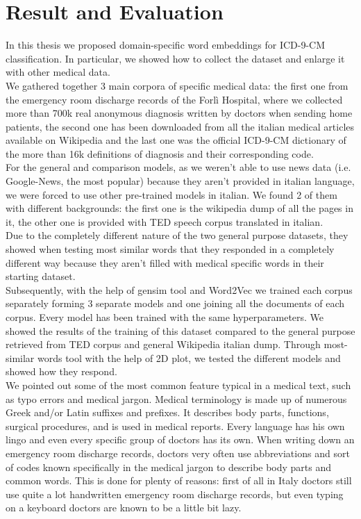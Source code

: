 \chapter{Result and Evaluation}
In this thesis we proposed domain-specific word embeddings for ICD-9-CM classification. In particular, we showed how to collect the dataset and enlarge it with other medical data.\\
We gathered together 3 main corpora of specific medical data: the first one from the emergency room discharge records of the Forlì Hospital, where we collected more than 700k real anonymous diagnosis written by doctors when sending home patients, the second one has been downloaded from all the italian medical articles available on Wikipedia and the last one was the official ICD-9-CM dictionary of the more than 16k definitions of diagnosis and their corresponding code.\\
For the general and comparison models, as we weren't able to use news data (i.e. Google-News, the most popular) because they aren't provided in italian language, we were forced to use other pre-trained models in italian. We found 2 of them with different backgrounds: the first one is the wikipedia dump of all the pages in it, the other one is provided with TED speech corpus translated in italian.\\
Due to the completely different nature of the two general purpose datasets, they showed when testing most similar words that they responded in a completely different way because they aren't filled with medical specific words in their starting dataset.\\
Subsequently, with the help of gensim tool and Word2Vec we trained each corpus separately forming 3 separate models and one joining all the documents of each corpus. Every model has been trained with the same hyperparameters.
We showed the results of the training of this dataset compared to the general purpose retrieved from TED corpus and general Wikipedia italian dump. Through most-similar words tool with the help of 2D plot, we tested the different models and showed how they respond.\\
We pointed out some of the most common feature typical in a medical text, such as typo errors and medical jargon. Medical terminology is made up of numerous Greek and/or Latin suffixes and prefixes. It describes body parts, functions, surgical procedures, and is used in medical reports. Every language has his own lingo and even every specific group of doctors has its own. When writing down an emergency room discharge records, doctors very often use abbreviations and sort of codes known specifically in the medical jargon to describe body parts and common words. This is done for plenty of reasons: first of all in Italy doctors still use quite a lot handwritten emergency room discharge records, but even typing on a keyboard doctors are known to be a little bit lazy.\\
